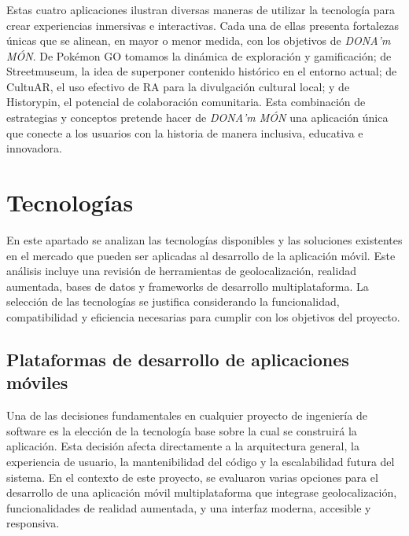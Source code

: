 \subsubsection{}

Estas cuatro aplicaciones ilustran diversas maneras de utilizar la tecnología para crear experiencias inmersivas e interactivas. Cada una de ellas presenta fortalezas únicas que se alinean, en mayor o menor medida, con los objetivos de \textit{DONA'm MÓN}. De Pokémon GO tomamos la dinámica de exploración y gamificación; de Streetmuseum, la idea de superponer contenido histórico en el entorno actual; de CultuAR, el uso efectivo de RA para la divulgación cultural local; y de Historypin, el potencial de colaboración comunitaria. Esta combinación de estrategias y conceptos pretende hacer de \textit{DONA'm MÓN} una aplicación única que conecte a los usuarios con la historia de manera inclusiva, educativa e innovadora.



\section{Tecnologías}
En este apartado se analizan las tecnologías disponibles y las soluciones existentes en el mercado que pueden ser aplicadas al desarrollo de la aplicación móvil. Este análisis incluye una revisión de herramientas de geolocalización, realidad aumentada, bases de datos y frameworks de desarrollo multiplataforma. La selección de las tecnologías se justifica considerando la funcionalidad, compatibilidad y eficiencia necesarias para cumplir con los objetivos del proyecto.

\subsection{Plataformas de desarrollo de aplicaciones móviles}

Una de las decisiones fundamentales en cualquier proyecto de ingeniería de software es la elección de la tecnología base sobre la cual se construirá la aplicación. Esta decisión afecta directamente a la arquitectura general, la experiencia de usuario, la mantenibilidad del código y la escalabilidad futura del sistema. En el contexto de este proyecto, se evaluaron varias opciones para el desarrollo de una aplicación móvil multiplataforma que integrase geolocalización, funcionalidades de realidad aumentada, y una interfaz moderna, accesible y responsiva.

